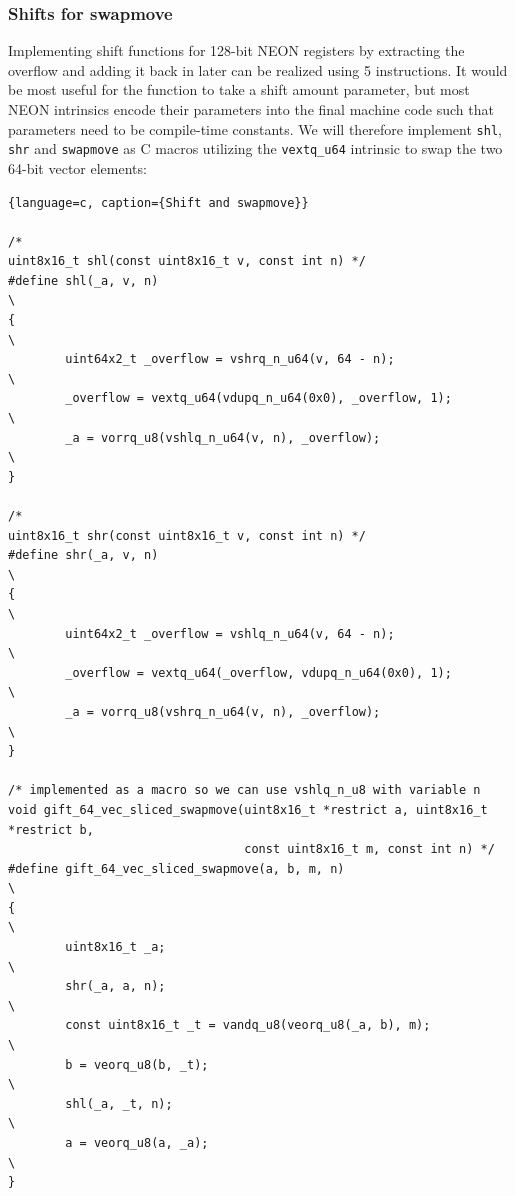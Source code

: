\subsubsection{Shifts for swapmove}

Implementing shift functions for 128-bit NEON registers by extracting the
overflow and adding it back in later can be realized using 5 instructions. It
would be most useful for the function to take a shift amount parameter, but
most NEON intrinsics encode their parameters into the final machine code such
that parameters need to be compile-time constants. We will therefore implement
\texttt{shl}, \texttt{shr} and \texttt{swapmove} as C macros utilizing the
\texttt{vextq\_u64} intrinsic to swap the two 64-bit vector elements:

\begin{lstlisting}{language=c, caption={Shift and swapmove}}

/*
uint8x16_t shl(const uint8x16_t v, const int n) */
#define shl(_a, v, n)                                                       \
{                                                                           \
        uint64x2_t _overflow = vshrq_n_u64(v, 64 - n);                      \
        _overflow = vextq_u64(vdupq_n_u64(0x0), _overflow, 1);              \
        _a = vorrq_u8(vshlq_n_u64(v, n), _overflow);                        \
}

/*
uint8x16_t shr(const uint8x16_t v, const int n) */
#define shr(_a, v, n)                                                       \
{                                                                           \
        uint64x2_t _overflow = vshlq_n_u64(v, 64 - n);                      \
        _overflow = vextq_u64(_overflow, vdupq_n_u64(0x0), 1);              \
        _a = vorrq_u8(vshrq_n_u64(v, n), _overflow);                        \
}

/* implemented as a macro so we can use vshlq_n_u8 with variable n
void gift_64_vec_sliced_swapmove(uint8x16_t *restrict a, uint8x16_t *restrict b,
                                 const uint8x16_t m, const int n) */
#define gift_64_vec_sliced_swapmove(a, b, m, n)                             \
{                                                                           \
        uint8x16_t _a;                                                      \
        shr(_a, a, n);                                                      \
        const uint8x16_t _t = vandq_u8(veorq_u8(_a, b), m);                 \
        b = veorq_u8(b, _t);                                                \
        shl(_a, _t, n);                                                     \
        a = veorq_u8(a, _a);                                                \
}
\end{lstlisting}

